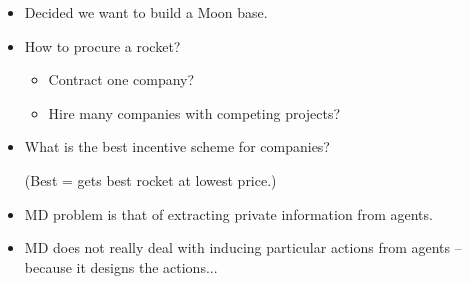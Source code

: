 \documentclass[english,handout,10pt]{beamer}		%
\def\lyxframeend{} %
\begin{document}
\begin{itemize}
	\item Decided we want to build a Moon base.
	\item How to procure a rocket?
	\begin{itemize}
		\item Contract one company?
		\item Hire many companies with competing projects?
	\end{itemize}
	\item What is the best incentive scheme for companies? 
	
	(Best = gets best rocket at lowest price.)
\end{itemize}
\lyxframeend


\begin{itemize}
	\item MD problem is that of extracting private information from agents.
	
	\item MD does not really deal with inducing particular actions from agents -- because it designs the actions...
\end{itemize}
\lyxframeend


%	
\end{document}
